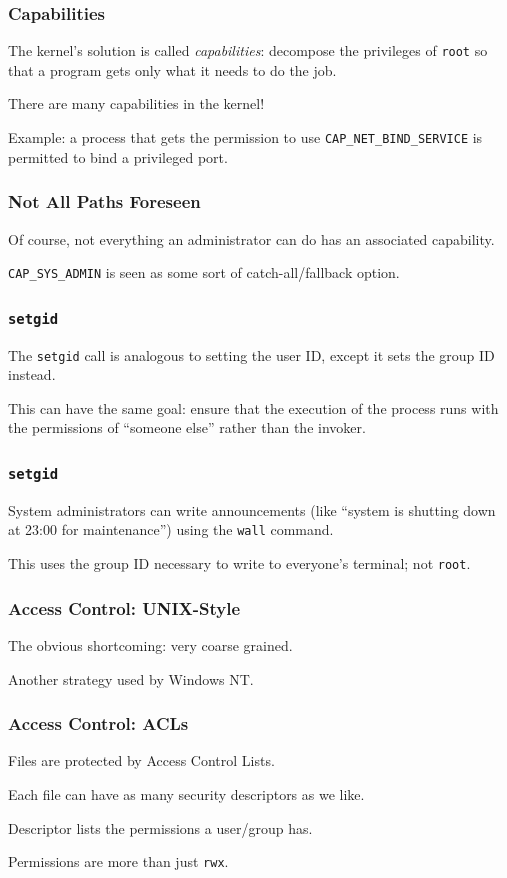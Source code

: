 \begin{frame}
\frametitle{Capabilities}

The kernel's solution is called \textit{capabilities}: decompose the privileges of \texttt{root} so that a program gets only what it needs to do the job.

There are many capabilities in the kernel!

Example: a process that gets the permission to use \texttt{CAP\_NET\_BIND\_SERVICE} is permitted to bind a privileged port.

\end{frame}


\begin{frame}
\frametitle{Not All Paths Foreseen}

Of course, not everything an administrator can do has an associated capability.

\texttt{CAP\_SYS\_ADMIN} is seen as some sort of catch-all/fallback option. 


\end{frame}


\begin{frame}
\frametitle{\texttt{setgid}}
The \texttt{setgid} call is analogous to setting the user ID, except it sets the group ID instead. 

This can have the same goal: ensure that the execution of the process runs with the permissions of ``someone else'' rather than the invoker.

\end{frame}


\begin{frame}
\frametitle{\texttt{setgid}}

System administrators can write announcements (like ``system is shutting down at 23:00 for maintenance'') using the \texttt{wall} command.

This uses the group ID necessary to write to everyone's terminal; not \texttt{root}. 


\end{frame}


\begin{frame}
\frametitle{Access Control: UNIX-Style}


The obvious shortcoming: very coarse grained.

Another strategy used by Windows NT.


\end{frame}

\begin{frame}
\frametitle{Access Control: ACLs}


Files are protected by Access Control Lists.

Each file can have as many security descriptors as we like.

Descriptor lists the permissions a user/group has.

Permissions are more than just \texttt{rwx}.


\end{frame}


